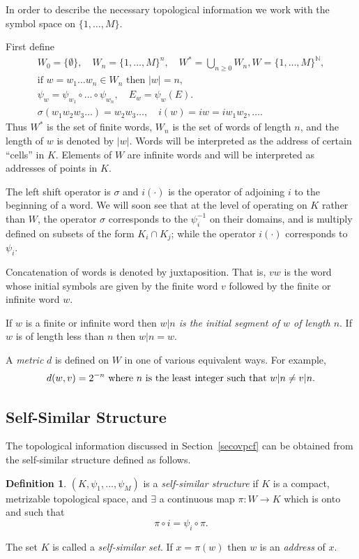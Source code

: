 \documentclass[a4paper]{amsart}
\theoremstyle{plain}
\theoremstyle{definition}
\newtheorem{definition}[theorem]{Definition}%
\theoremstyle{remark}
\begin{document}
In order to describe the necessary topological information we  work with the symbol space on $ \{1,\dots, M \} $.

First define 
\begin{gather}
W_0 = \{\emptyset\}, \quad W_n = \{1,\dots, M\}^n, \quad W^* = \bigcup_{n\geq 0} W_n ,
W = \{1,\dots,M\}^\mathbb{N}, \\
\text{if } w = w_1\dots w_n \in W_n \text{ then } |w| =n,\\
\psi_w = \psi_{w_1}\circ \dots \circ \psi_{w_n} , \quad E_w = \psi_w(E). \\
\sigma(w_1w_2w_3\dots) = w_2w_3 \dots , \quad i(w) = iw = i w_1w_2,\dots.
\end{gather} 
Thus $ W^* $ is the set of finite words, $ W_n $ is the set of words of length $ n $, and the length of $ w $ is denoted by $ |w| $.  Words will be interpreted as the  address of certain ``cells'' in $ K $.  Elements of $ W $ are infinite words and will be interpreted as addresses  of points in $ K $.  

The left shift operator is $ \sigma $ and $ i(\cdot) $ is the operator of adjoining $ i $ to the beginning of a word.  We will soon see that at the level of operating on $ K $ rather than $ W$, the operator $ \sigma$ corresponds to the $ \psi_i^{-1} $ on their domains, and is multiply defined on subsets of the form $ K_i \cap K_j $; while the operator $ i (\cdot) $ corresponds to $ \psi_i $.

Concatenation of words is denoted by juxtaposition.  That is, $ v w $ is the word whose initial symbols are given by the finite word  $ v $ followed by the finite or infinite word $ w$.

If  $  w $ is a finite or infinite word then \emph{$ w|n $ is the initial segment of $ w $ of length $ n$}.  If $ w $ is of length less than $ n $ then $ w|n = w$.

\medskip A \emph{metric} $ d$ is defined on $ W$ in one of various equivalent ways.  For example,
\[ d(w,v) = 2^{-n} \text{ where $ n$  is the least integer such that } w|n  \neq v|n.\]

\subsection{Self-Similar Structure}  The topological information discussed in Section~\ref{secovpcf} can be obtained from the self-similar structure defined as follows.

\begin{definition}\label{defsss}
$(K,\psi_1,\dots,\psi_M)$ is a \emph{self-similar  structure} if $ K $ is a compact, metrizable topological space, and $ \exists $ a continuous map $ \pi:W\to K $ which is onto and such that 
\begin{equation} \label{} \pi \circ i = \psi_i\circ \pi.\end{equation} 

The set $ K $ is called a \emph{self-similar set}.  If $ x = \pi(w) $ then $ w $ is an \emph{address} of $ x $.
\end{definition}
\end{document}
